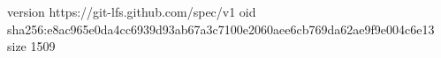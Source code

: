 version https://git-lfs.github.com/spec/v1
oid sha256:e8ac965e0da4cc6939d93ab67a3c7100e2060aee6cb769da62ae9f9e004c6e13
size 1509
